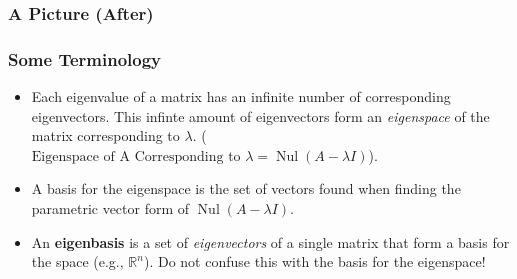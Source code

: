 \documentclass{beamer}
\DeclareMathOperator{\nullspace}{Nul}
\begin{document}
	\begin{frame}
		\frametitle{A Picture (After)}
		\begin{figure}[!h]
		\end{figure}
	\end{frame}

	\begin{frame}
		\frametitle{Some Terminology}
		\begin{itemize}
			\item<1-> Each eigenvalue of a matrix has an infinite number of corresponding eigenvectors. This infinte amount of eigenvectors form an 
				\emph{eigenspace} of the matrix corresponding to \(\lambda\). \pause 
				(\(\text{Eigenspace of A Corresponding to } \lambda = \nullspace(A - \lambda I)\)).
			\item<2-> A basis for the eigenspace is the set of vectors found when finding the parametric vector form of \(\nullspace(A - \lambda I)\).
			\item<3-| alert@3> An \textbf{eigenbasis} is a set of \emph{eigenvectors} of a single matrix that form a basis for the space 
				(e.g., \(\mathbb{R}^n\)). Do not confuse this with the basis for the eigenspace!
		\end{itemize}
	\end{frame}
\end{document}
